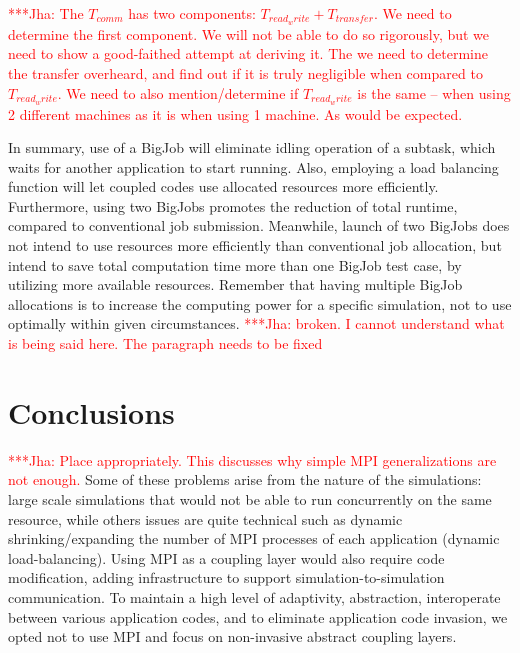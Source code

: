 \documentclass[conference,final]{IEEEtran}
\newcommand{\jhanote}[1]{ {\textcolor{red} { ***Jha: #1 }}}
\newcommand{\jhanote}[1]{}
\begin{document}
\begin{table}[!h]
\begin{center}
\begin{tabular}{ c | c  c  c  c}
\end{tabular}
\end{center}
\end{table}

\jhanote{The $T_{comm}$ has two components: $T_{read_write} +
  T_{transfer}$. We need to determine the first component. We will not
  be able to do so rigorously, but we need to show a good-faithed
  attempt at deriving it.  The we need to determine the transfer
  overheard, and find out if it is truly negligible when compared to
  $T_{read_write}$. We need to also mention/determine if
  $T_{read_write}$ is the same -- when using 2 different machines as
  it is when using 1 machine. As would be expected.}

In summary, use of a BigJob will eliminate idling operation of a
subtask, which waits for another application to start running. Also,
employing a load balancing function will let coupled codes use
allocated resources more efficiently. Furthermore, using two BigJobs
promotes the reduction of total runtime, compared to
conventional job submission. Meanwhile, launch of two BigJobs does not
intend to use resources more efficiently than conventional job
allocation, but intend to save total computation time more than one
BigJob test case, by utilizing more available resources. Remember that
having multiple BigJob allocations is to increase the computing power
for a specific simulation, not to use optimally within given
circumstances. \jhanote{broken. I cannot understand what is being said
  here. The paragraph needs to be fixed}
  
  
\section{Conclusions}

\jhanote{Place appropriately. This discusses why simple MPI
  generalizations are not enough.} Some of these problems arise from
the nature of the simulations: large scale simulations that would not
be able to run concurrently on the same resource, while others issues
are quite technical such as dynamic shrinking/expanding the number of
MPI processes of each application (dynamic load-balancing). Using MPI
as a coupling layer would also require code modification, adding
infrastructure to support simulation-to-simulation communication. To
maintain a high level of adaptivity, abstraction, interoperate between
various application codes, and to eliminate application code invasion,
we opted not to use MPI and focus on non-invasive abstract coupling
layers.
\end{document}
